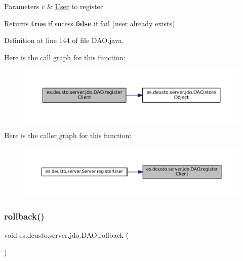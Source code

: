 \begin{DoxyParams}{Parameters}
{\em c} & \mbox{\hyperlink{classes_1_1deusto_1_1server_1_1jdo_1_1_user}{User}} to register \\
\hline
\end{DoxyParams}
\begin{DoxyReturn}{Returns}
{\bfseries{true}} if sucess {\bfseries{false}} if fail (user already exists) 
\end{DoxyReturn}


Definition at line 144 of file D\+A\+O.\+java.

Here is the call graph for this function\+:
\nopagebreak
\begin{figure}[H]
\begin{center}
\leavevmode
\includegraphics[width=350pt]{classes_1_1deusto_1_1server_1_1jdo_1_1_d_a_o_a783758c37658336ee1e4e995a672a0ce_cgraph}
\end{center}
\end{figure}
Here is the caller graph for this function\+:
\nopagebreak
\begin{figure}[H]
\begin{center}
\leavevmode
\includegraphics[width=350pt]{classes_1_1deusto_1_1server_1_1jdo_1_1_d_a_o_a783758c37658336ee1e4e995a672a0ce_icgraph}
\end{center}
\end{figure}
\mbox{\label{classes_1_1deusto_1_1server_1_1jdo_1_1_d_a_o_ac2a137746dce274ba0a89eb388820bcf}} 
\subsubsection{\texorpdfstring{rollback()}{rollback()}}
{\footnotesize\ttfamily void es.\+deusto.\+server.\+jdo.\+D\+A\+O.\+rollback (\begin{DoxyParamCaption}{ }\end{DoxyParamCaption})}



